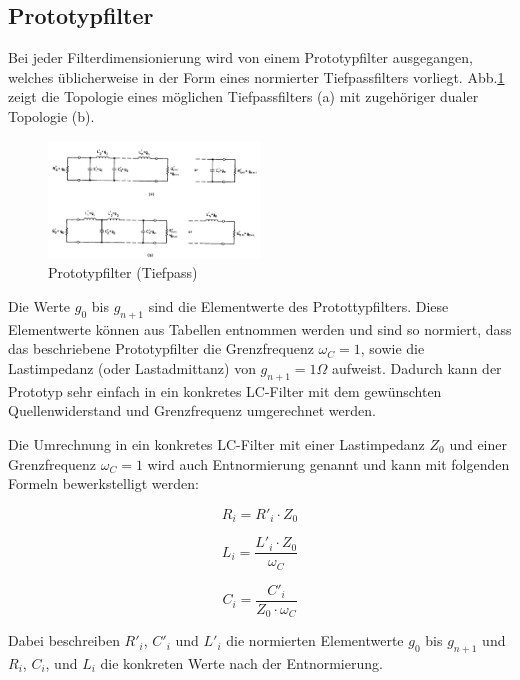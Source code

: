 \subsection{Prototypfilter}

Bei jeder Filterdimensionierung wird von einem Prototypfilter ausgegangen, welches üblicherweise in der Form eines normierter Tiefpassfilters vorliegt. Abb.\ref{fig:Prototyp_Filter} zeigt die Topologie eines möglichen Tiefpassfilters (a) mit zugehöriger dualer Topologie (b).

\begin{figure}[h!]
\centering
 	\includegraphics[width=0.5\textwidth]{Prototyp_Filter.png}
 	\caption{Prototypfilter (Tiefpass)}
 	\label{fig:Prototyp_Filter}
\end{figure}


Die Werte $g_0$ bis $g_{n+1}$ sind die Elementwerte des Protottypfilters. Diese Elementwerte können aus Tabellen entnommen werden und sind so normiert, dass das beschriebene  Prototypfilter die Grenzfrequenz $\omega_{C} = 1$, sowie die Lastimpedanz (oder Lastadmittanz) von $g_{n+1}=1\Omega$ aufweist. Dadurch kann der Prototyp sehr einfach in ein konkretes LC-Filter mit dem gewünschten Quellenwiderstand und Grenzfrequenz umgerechnet werden. 

Die Umrechnung in ein konkretes LC-Filter mit einer Lastimpedanz $Z_0$ und einer Grenzfrequenz $\omega_{C} = 1$ wird auch Entnormierung genannt und kann mit folgenden Formeln bewerkstelligt werden: 

\begin{equation}\label{eq:R}	
R_i = R'_i \cdot Z_0
\end{equation}

\begin{equation}\label{eq:L}	
L_i = \frac{L'_i \cdot Z_0}{\omega_{C}}
\end{equation}

\begin{equation}\label{eq:C}	
C_i = \frac{C'_i}{Z_0 \cdot \omega_{C}}
\end{equation}

Dabei beschreiben  $R'_i$, $C'_i$ und $L'_i$ die normierten Elementwerte  $g_0$ bis $g_{n+1}$ und $R_i$, $C_i$, und $L_i$ die konkreten Werte nach der Entnormierung.
